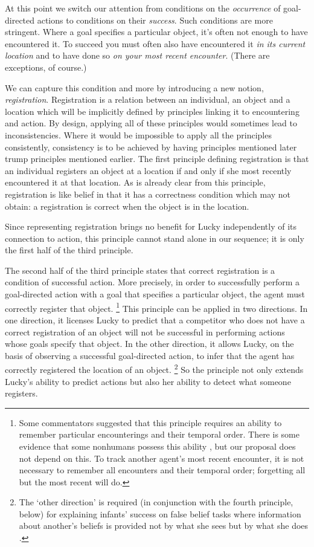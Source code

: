 \documentclass[12pt,\papersize]{extarticle}
\begin{document}
At this point we switch our attention from conditions on the \textit{occurrence} of goal-directed actions to conditions on their \textit{success}.  Such conditions are more stringent.  Where a goal specifies a particular object, it’s often not enough to have encountered it.  To succeed you must often also have encountered it \textit{in its current location} and to have done so \textit{on your most recent encounter}.  
(There are exceptions, of course.)

We can capture this condition and more by introducing a new notion, \textit{registration}.  Registration is a relation between an individual, an object and a location which will be implicitly defined by principles linking it to encountering and action.  
By design, applying all of these principles would sometimes lead to inconsistencies.  
Where it would be impossible to apply all the principles consistently, consistency is to be achieved by having principles mentioned later trump principles mentioned earlier.
The first  principle defining registration is that an individual registers an object at a location if and only if she most recently encountered it at that location.  As is already clear from this principle, registration is like belief in that it has a correctness condition which may not obtain: a registration is correct when the object is in the location.   


Since representing registration brings no benefit for Lucky independently of its connection to action, this principle cannot stand alone in our sequence; it is only the first half of the third principle.

The second half of the third principle states that correct registration is a condition of successful action.  More precisely, in order to successfully perform a goal-directed action with a goal that specifies a particular object, the agent must correctly register that object.%
\footnote{ 	
Some commentators suggested that this principle requires an ability to remember particular encounterings and their temporal order.  There is some evidence that some nonhumans possess this ability \citep[e.g.][]{en_1714, en_1715}, but our proposal does not depend on this.  To track another agent’s most recent encounter, it is not necessary to remember all encounters and their temporal order; forgetting all but the most recent will do.
}  
This principle can be applied in two directions.  In one direction, it licenses Lucky to predict that a competitor who does not have a correct registration of an object will not be successful in performing actions whose goals specify that object.  In the other direction, it allows Lucky, on the basis of observing a successful goal-directed action, to infer that the agent has correctly registered the location of an object.%
\footnote{ 	
The ‘other direction’ is required (in conjunction with the fourth principle, below) for explaining infants’ success on false belief tasks where information about another’s beliefs is provided not by what she sees but by what she does \citep[as in][]{en_1824}.
}
So the principle not only extends Lucky’s ability to predict actions but also her ability to detect what someone registers.  
\end{document}
